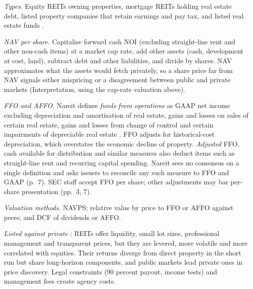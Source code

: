 \begin{qfmethod}\label{meth:reit-valuation}
 \emph{Types.} Equity REITs owning properties, mortgage REITs holding real estate debt, listed property companies that retain earnings and pay tax, and listed real estate funds \citep[pp.~376, 380]{s7-ang}.

\emph{NAV per share.} Capitalise forward cash NOI (excluding straight-line rent and other non-cash items) at a market cap rate, add other assets (cash, development at cost, land), subtract debt and other liabilities, and divide by shares. NAV approximates what the assets would fetch privately, so a share price far from NAV signals either mispricing or a disagreement between public and private markets (Interpretation, using the cap-rate valuation above).

\emph{FFO and AFFO.} Nareit defines \emph{funds from operations} as GAAP net income excluding depreciation and amortisation of real estate, gains and losses on sales of certain real estate, gains and losses from change of control and certain impairments of depreciable real estate \citep[p.~2]{nareit-ffo-2018}. FFO adjusts for historical-cost depreciation, which overstates the economic decline of property. \emph{Adjusted} FFO, cash available for distribution and similar measures also deduct items such as straight-line rent and recurring capital spending. Nareit sees no consensus on a single definition and asks issuers to reconcile any such measure to FFO and GAAP (p.~7). SEC staff accept FFO per share; other adjustments may bar per-share presentation (pp.~3, 7).

\emph{Valuation methods.} NAVPS; relative value by price to FFO or AFFO against peers; and DCF of dividends or AFFO.

\emph{Listed against private} \citep[pp.~376--380]{s7-ang}: REITs offer liquidity, small lot sizes, professional management and transparent prices, but they are levered, more volatile and more correlated with equities. Their returns diverge from direct property in the short run but share long-horizon components, and public markets lead private ones in price discovery. Legal constraints (90 percent payout, income tests) and management fees create agency costs.


\end{qfmethod}

